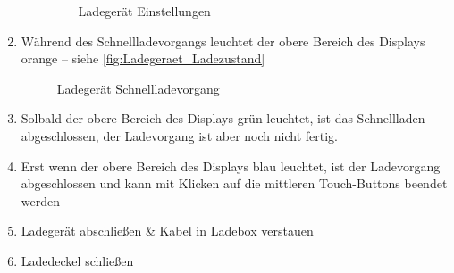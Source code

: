 \begin{enumerate}
\begin{enumerate}
\begin{figure}[H]
            \centering
            \caption{Ladegerät Einstellungen \label{fig:Ladegeraet_Menueanzeige2}}
        \end{figure}
    \end{enumerate}
    \newpage
    \item Während des Schnellladevorgangs leuchtet der obere Bereich des Displays orange -- siehe \autoref{fig:Ladegeraet_Ladezustand}
    \begin{figure}[H]
        \centering
        \caption{Ladegerät Schnellladevorgang \label{fig:Ladegeraet_Ladezustand}}
    \end{figure}
    \item Solbald der obere Bereich des Displays grün leuchtet, ist das Schnellladen abgeschlossen, der Ladevorgang ist aber noch nicht fertig.
    \item Erst wenn der obere Bereich des Displays blau leuchtet, ist der Ladevorgang abgeschlossen und kann mit Klicken auf die mittleren Touch-Buttons beendet werden
    \item Ladegerät abschließen \& Kabel in Ladebox verstauen
    \item Ladedeckel schließen
\end{enumerate}
